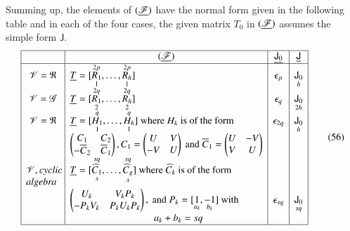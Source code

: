 Summing up, the elements of $(\underline{\mathscr{F}})$ have the normal form
given in the following table and in each of the four cases, the given
matrix $T_{0}$ in $(\underline{\mathscr{F}})$ assumes the simple form
$\mathsf{J}$. 
{\fontsize{9}{11}\selectfont
\begin{equation*}
\begin{array}{|c|l|c|c|}
\hline
 & \multicolumn{1}{c|}{(\ub{\mathscr{F}})} & \ub{\mathsf{J}_{0}} &
\ub{\mathsf{J}}\\
\hline
\mathscr{V}=\mathfrak{R} &
\ub{T}=[\underset{1}{\overset{2p}{R_{1}}},\ldots,\underset{1}{\overset{2p}{R_{h}}}]
  & \epsilon_{p} & \underset{h}{\mathsf{J}_{0}}\\
\mathscr{V}=\mathscr{G} &
\ub{T}=[\underset{2}{\overset{2q}{R_{1}}},\ldots,\underset{2}{\overset{2q}{R_{h}}}]
& \epsilon_{q} & \underset{2h}{\mathsf{J}_{0}}\\
\mathscr{V}=\mathfrak{R} & \ub{T}
=[\underset{1}{\overset{q}{H_{1}}},\ldots,\underset{1}{\overset{q}{H_{h}}}]
\text{ where } H_{k} \text{ is of the form} & \epsilon_{2q} &
\underset{h}{\mathsf{J}_{0}}\\
 & \begin{pmatrix}
     C_{1} & C_{2}\\
     -\ob{C}_{2} & \ob{C}_{1}
   \end{pmatrix}, C_{1}=
   \begin{pmatrix}
    U & V\\
    -V & U
   \end{pmatrix}\text{ and } \ob{C}_{1}=
   \begin{pmatrix}
     U & -V\\
     V & U
   \end{pmatrix} & & \\[5pt]
\multicolumn{1}{|p{1.2cm}|}{$\mathscr{V}$,~{\em cyclic algebra}} &
\ub{T}=[\underset{s}{\overset{sq}{\widehat{C}_{1}}},\ldots,\underset{s}{\overset{sq}{\widehat{C}_{g}}}]
\text{ where } \widehat{C}_{k} \text{ is of the form} & &\\
 & \begin{pmatrix}
     U_{k}  & V_{k} P_{k}\\
     -P_{k}V_{k} & P_{k}U_{k}P_{k}
   \end{pmatrix}, \text{ and }
P_{k}=[\underset{a_{k}}{1},\underset{b_{k}}{-1}] \text{ with} &
\epsilon_{sq} & \underset{sq}{\mathsf{J}_{0}}\\
 & \hspace{3cm} a_{k}+b_{k}=sq & & \\
\hline
\end{array}\tag{56}\label{eq56}
\end{equation*}}\relax\pageoriginale

